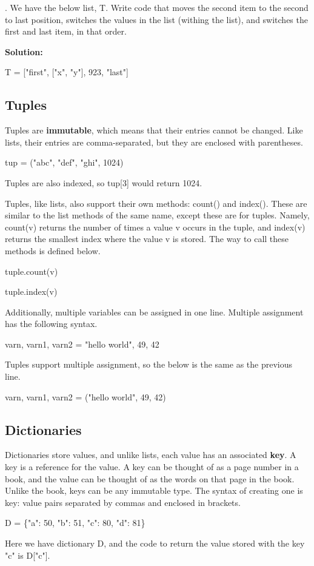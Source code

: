 \documentclass{article}
\newcommand{\define}[1]{\begin{center}\ttfamily #1\end{center}}
\newcommand{\icode}[1]{{\ttfamily #1}}
\newenvironment{code}{\begin{tcolorbox}\ttfamily}{\end{tcolorbox}}
\begin{document}
. We have the below list, \icode{T}. Write code that moves the second item to the second to last position, switches the values in the list (withing the list), and switches the first and last item, in that order.

\noindent\textbf{Solution:}
\begin{code}
	T = ["first", ["x", "y"], 923, "last"]
\vspace{3 cm}
\end{code}

\subsection{Tuples}
Tuples are \textbf{immutable}, which means that their entries cannot be changed. Like lists, their entries are comma-separated, but they are enclosed with parentheses.
\define{tup = ("abc", "def", "ghi", 1024)}
Tuples are also indexed, so {\ttfamily tup[3]} would return 1024.

Tuples, like lists, also support their own methods: {\ttfamily count()} and {\ttfamily index()}. These are similar to the list methods of the same name, except these are for tuples. Namely, {\ttfamily count(v)} returns the number of times a value {\ttfamily v} occurs in the tuple, and {\ttfamily index(v)} returns the smallest index where the value {\ttfamily v} is stored. The way to call these methods is defined below.
\define{tuple.count(v)}
\define{tuple.index(v)}
Additionally, multiple variables can be assigned in one line. Multiple assignment has the following syntax.
\define{varn, varn1, varn2 = "hello world", 49, 42}
Tuples support multiple assignment, so the below is the same as the previous line.
\define{varn, varn1, varn2 = ("hello world", 49, 42)}
\subsection{Dictionaries}
Dictionaries store values, and unlike lists, each value has an associated \textbf{key}. A key is a reference for the value. A key can be thought of as a page number in a book, and the value can be thought of as the words on that page in the book. Unlike the book, keys can be any immutable type. The syntax of creating one is {\ttfamily key: value} pairs separated by commas and enclosed in brackets.
\define{D = \{"a": 50, "b": 51, "c": 80, "d": 81\}}
Here we have dictionary \icode{D}, and the code to return the value stored with the key \icode{"c"} is \icode{D["c"]}.
\end{document}

